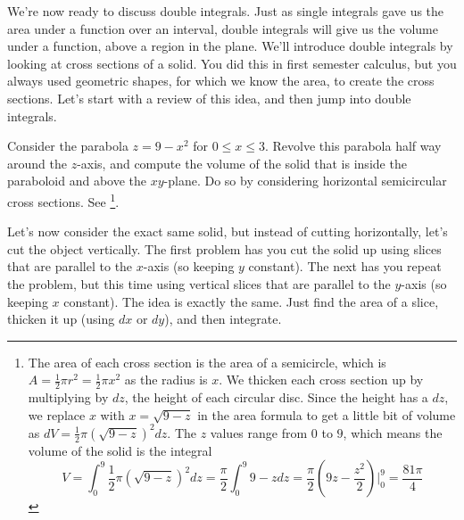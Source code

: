We're now ready to discuss double integrals. Just as single integrals gave us the area under a function over an interval, double integrals will give us the volume under a function, above a region in the plane.  We'll introduce double integrals by looking at cross sections of a solid.  You did this in first semester calculus, but you always used geometric shapes, for which we know the area, to create the cross sections.  Let's start with a review of this idea, and then jump into double integrals.




\begin{review*}
 Consider the parabola $z=9-x^2$ for $0\leq x\leq 3$. Revolve this parabola half way around the $z$-axis, and compute the volume of the solid that is inside the paraboloid and above the $xy$-plane.  Do so by considering horizontal semicircular cross sections. See \footnote{
The area of each cross section is the area of a semicircle, which is $A=\frac{1}{2}\pi r^2 = \frac12 \pi x^2$ as the radius is $x$. We thicken each cross section up by multiplying by $dz$, the height of each circular disc. Since the height has a $dz$, we replace $x$ with $x=\sqrt{9-z}$ in the area formula to get a little bit of volume as $dV = \frac{1}{2}\pi (\sqrt{9-z})^2 dz$.  The $z$ values range from $0$ to $9$, which means the volume of the solid is the integral 
$$V
=\int_0^9 \frac{1}{2}\pi (\sqrt{9-z})^2 dz
=\frac{\pi}{2}\int_0^9  9-z dz
=\frac{\pi}{2}  \left(9z-\frac{z^2}{2}\right)\bigg|_0^9
=\frac{81\pi}{4}
$$}.
\end{review*}



Let's now consider the exact same solid, but instead of cutting horizontally, let's cut the object vertically.  The first problem has you cut the solid up using slices that are parallel to the $x$-axis (so keeping $y$ constant).  The next has you repeat the problem, but this time using vertical slices that are parallel to the $y$-axis (so keeping $x$ constant).  The idea is exactly the same.  Just find the area of a slice, thicken it up (using $dx$ or $dy$), and then integrate.  



